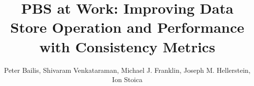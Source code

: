 \documentclass{sig-alternate}
\begin{document}
\title{PBS at Work: Improving Data Store Operation and Performance
  with Consistency Metrics}

\author{Peter Bailis, Shivaram Venkataraman, Michael J. Franklin, Joseph M. Hellerstein, Ion Stoica\\
\\
}


\maketitle






\balance


\begin{comment}
\section{Acknowledgments}
TODO: Thanks Jonathan Ellis for his help in creating the Cassandra patch and
integrating it. Thank LinkedIn folks who helped in Voldemort measurement patch
etc.

This research is supported in part by NSF CISE Expeditions award CCF-1139158,
gifts from Amazon Web Services, Google, SAP,  Blue Goji, Cisco, Cloudera,
Ericsson, General Electric, Hewlett Packard, Huawei, Intel, Microsoft, NetApp,
Oracle, Quanta, Splunk, VMware and by DARPA (contract \#FA8650-11-C-7136).

TODO: Add any other funding agencies ?
\end{comment}




\end{document}
